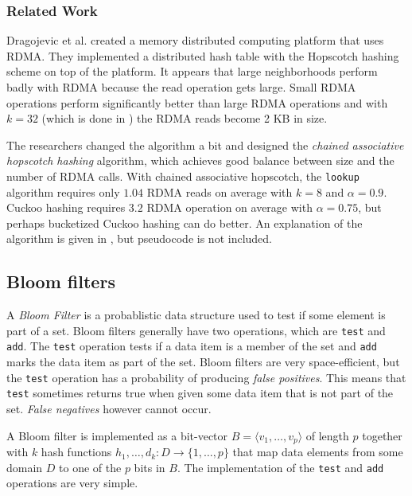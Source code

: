 \subsubsection{Related Work}
Dragojevic et al. \cite{farm} created a memory distributed computing platform that uses RDMA. They implemented a distributed hash table with the Hopscotch hashing scheme on top of the platform. It appears that large neighborhoods perform badly with RDMA because the read operation gets large. Small RDMA operations perform significantly better than large RDMA operations and with $k = 32$ (which is done in \cite{hopscotch}) the RDMA reads become 2 KB in size. 

The researchers changed the algorithm a bit and designed the \emph{chained associative hopscotch hashing} algorithm, which achieves good balance between size and the number of RDMA calls. With chained associative hopscotch, the \texttt{lookup} algorithm requires only $1.04$ RDMA reads on average with $k = 8$ and $\alpha = 0.9$. Cuckoo hashing requires $3.2$ RDMA operation on average with $\alpha = 0.75$, but perhaps bucketized Cuckoo hashing can do better. An explanation of the algorithm is given in \cite{farm}, but pseudocode is not included.

\subsection{Bloom filters}
A \emph{Bloom Filter} \cite{dharmapurikar2003longest} is a probablistic data structure used to test if some element is part of a set. Bloom filters generally have two operations, which are \texttt{test} and \texttt{add}. The \texttt{test} operation tests if a data item is a member of the set and \texttt{add} marks the data item as part of the set. Bloom filters are very space-efficient, but the \texttt{test} operation has a probability of producing \emph{false positives}. This means that \texttt{test} sometimes returns true when given some data item that is not part of the set. \emph{False negatives} however cannot occur. 

A Bloom filter is implemented as a bit-vector $B = \langle v_1, \dots, v_p \rangle$ of length $p$ together with $k$ hash functions $h_1, \dots, d_k : D \rightarrow \{ 1, \dots, p \}$ that map data elements from some domain $D$ to one of the $p$ bits in $B$. The implementation of the \texttt{test} and \texttt{add} operations are very simple.

